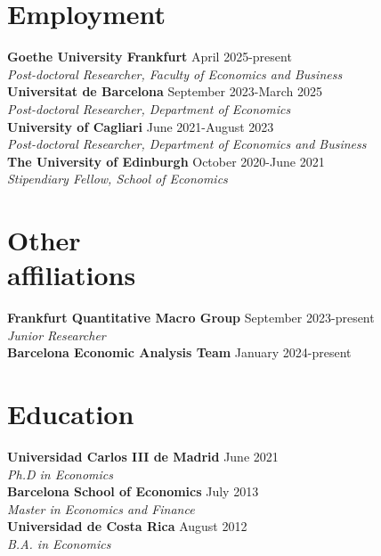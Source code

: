 \documentclass[margin]{res} %
\begin{document}
\begin{resume}

 
\section{Employment}
{\bf Goethe University Frankfurt} \hfill April 2025-present  \\
{\sl Post-doctoral Researcher, Faculty of Economics and Business} \\
{\bf Universitat de Barcelona} \hfill September 2023-March 2025  \\
{\sl Post-doctoral Researcher, Department of Economics} \\
{\bf University of Cagliari} \hfill June 2021-August 2023  \\
{\sl Post-doctoral Researcher, Department of Economics and Business} \\
{\bf The University of Edinburgh} \hfill October 2020-June 2021  \\
{\sl Stipendiary Fellow, School of Economics} 


\section{Other \\ affiliations}
{\bf Frankfurt Quantitative Macro Group} \hfill September 2023-present  \\
{\sl Junior Researcher} \\
{\bf Barcelona Economic Analysis Team} \hfill January 2024-present 


\section{Education}
{\bf Universidad Carlos III de Madrid} \hfill June 2021  \\
{\sl Ph.D in Economics} \\
{\bf Barcelona School of Economics} \hfill July 2013 \\
{\sl Master in Economics and Finance}  \\
{\bf Universidad de Costa Rica} \hfill August 2012 \\
{\sl B.A. in Economics}


\end{resume}
\end{document}
